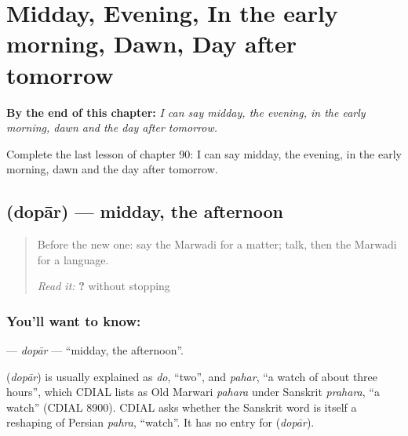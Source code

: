 
\chapter{Midday, Evening, In the early morning, Dawn, Day after tomorrow}
\label{ch:mw-midday-evening-in-the-early-morning-dawn-day-after-tomorrow}

\begin{chapteropening}
\textbf{By the end of this chapter:} \emph{I can say midday, the evening, in the early morning, dawn and the day after tomorrow.}

Complete the last lesson of chapter 90: I can say midday, the evening, in the early morning, dawn and the day after tomorrow.
\end{chapteropening}

\section[\texorpdfstring{\mw{दोपार} (dopār)}{दोपार (dopār)}]{ (dopār) — midday, the afternoon}

\label{lesson:MW-C90-dopar}



\begin{quote}
Before the new one: say the Marwadi for a matter; talk, then the Marwadi for a language.

\emph{Read it:} \textbf{      ?} without stopping
\end{quote}

\subsection*{You'll want to know: }
\textbf{} — \emph{dopār} — \textquotedblleft{}midday, the afternoon\textquotedblright{}.

\begin{cousinweb}
\textbf{} (\emph{dopār}) is usually explained as \emph{do}, \textquotedblleft{}two\textquotedblright{}, and \emph{pahar}, \textquotedblleft{}a watch of about three hours\textquotedblright{}, which CDIAL lists as Old Marwari \emph{pahara} under Sanskrit \emph{prahara}, \textquotedblleft{}a watch\textquotedblright{} (CDIAL 8900). CDIAL asks whether the Sanskrit word is itself a reshaping of Persian \emph{pahra}, \textquotedblleft{}watch\textquotedblright{}. It has no entry for \textbf{} (\emph{dopār}).
\end{cousinweb}

